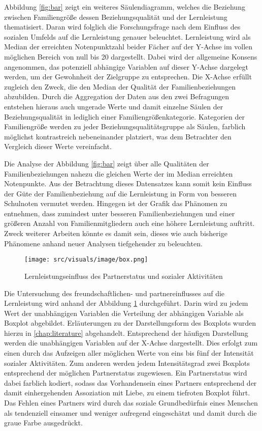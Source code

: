 Abbildung \ref{fig:bar} zeigt ein weiteres Säulendiagramm, welches die Beziehung zwischen Familiengröße dessen Beziehungsqualität und der Lernleistung thematisiert.
Daran wird folglich die Forschungsfrage nach dem Einfluss des sozialen Umfelds auf die Lernleistung genauer beleuchtet.
Lernleistung wird als Median der erreichten Notenpunktzahl beider Fächer auf der Y-Achse im vollen möglichen Bereich von null bis 20 dargestellt.
Dabei wird der allgemeine Konsens angenommen, das potenziell abhängige Variablen auf dieser Y-Achse dargelegt werden, um der Gewohnheit der Zielgruppe zu entsprechen.
Die X-Achse erfüllt zugleich den Zweck, die den Median der Qualität der Familienbeziehungen abzubilden.
Durch die Aggregation der Daten aus den zwei Befragungen entstehen hieraus auch ungerade Werte und damit einzelne Säulen der Beziehungsqualität in lediglich einer Familiengrößenkategorie.
Kategorien der Familiengröße werden zu jeder Beziehungsqualitätsgruppe als Säulen, farblich möglichst kontrastreich nebeneinander platziert, was dem Betrachter den Vergleich dieser Werte vereinfacht. 

Die Analyse der Abbildung \ref{fig:bar} zeigt über alle Qualitäten der Familienbeziehungen nahezu die gleichen Werte der im Median erreichten Notenpunkte.
Aus der Betrachtung dieses Datensatzes kann somit kein Einfluss der Güte der Familienbeziehung auf die Lernleistung in Form von besseren Schulnoten vermutet werden.
Hingegen ist der Grafik das Phänomen zu entnehmen, dass zumindest unter besseren Familienbeziehungen und einer größeren Anzahl von Familienmitgliedern auch eine höhere Lernleistung auftritt.
Zweck weiterer Arbeiten könnte es damit sein, dieses wie auch bisherige Phänomene anhand neuer Analysen tiefgehender zu beleuchten.

\begin{figure}[htb]
    \centering
    \texttt{[image: src/visuals/image/box.png]}
    \caption{Lernleistungseinfluss des Partnerstatus und sozialer Aktivitäten}
    \label{fig:box}
\end{figure}

Die Untersuchung des freundschaftlichen- und partnereinflusses auf die Lernleistung wird anhand der Abbildung \ref{fig:box} durchgeführt.
Darin wird zu jedem Wert der unabhängigen Variablen die Verteilung der abhängigen Variable als Boxplot abgebildet.
Erläuterungen zu der Darstellungsform des Boxplots wurden hierzu in \autoref{chap:literature} abgehandelt.
Entsprechend der häufigen Darstellung werden die unabhängigen Variablen auf der X-Achse dargestellt.
Dies erfolgt zum einen durch das Aufzeigen aller möglichen Werte von eins bis fünf der Intensität sozialer Aktivitäten.
Zum anderen werden jedem Intensitätsgrad zwei Boxplots entsprechend der möglichen Partnerstatus zugewiesen.
Ein Partnerstatus wird dabei farblich kodiert, sodass das Vorhandensein eines Partners entsprechend der damit einhergehenden Assoziation mit Liebe, zu einem tiefroten Boxplot führt.
Das Fehlen eines Partners wird durch das soziale Grundbedürfnis eines Menschen als tendenziell einsamer und weniger aufregend eingeschätzt und damit durch die graue Farbe ausgedrückt.

